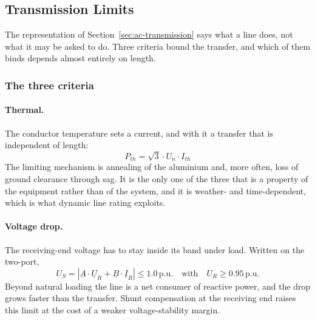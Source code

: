 \subsection{Transmission Limits}
\label{sec:limits}

The representation of Section~\ref{sec:ac-transmission} says what a line
does, not what it may be asked to do. Three criteria bound the transfer, and
which of them binds depends almost entirely on length.

\subsubsection{The three criteria}
\label{sec:limits-three}

\paragraph{Thermal.} The conductor temperature sets a current, and with it a
transfer that is independent of length:
\begin{equation}
  P_{th} = \sqrt{3} \cdot U_n \cdot I_{th}
  \label{eq:lim-thermal}
\end{equation}
The limiting mechanism is annealing of the aluminium and, more often, loss
of ground clearance through sag. It is the only one of the three that is a
property of the equipment rather than of the system, and it is weather- and
time-dependent, which is what dynamic line rating exploits.

\paragraph{Voltage drop.} The receiving-end voltage has to stay inside its
band under load. Written on the two-port,
\begin{equation}
  U_S = \left|\underline{A} \cdot \underline{U}_R
             + \underline{B} \cdot \underline{I}_R\right|
      \le 1.0\,\text{p.u.}
  \quad\text{with}\quad
  U_R \ge 0.95\,\text{p.u.}
  \label{eq:lim-voltage}
\end{equation}
Beyond natural loading the line is a net consumer of reactive power, and the
drop grows faster than the transfer. Shunt compensation at the receiving end
raises this limit at the cost of a weaker voltage-stability margin.

